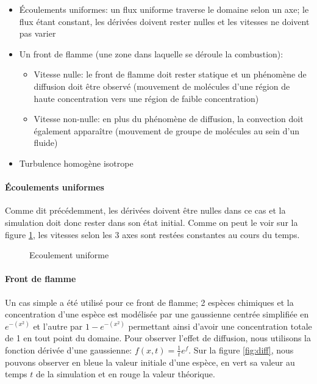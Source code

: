 \begin{itemize}
\item Écoulements uniformes: un flux uniforme traverse le domaine selon un axe; le flux étant constant, les dérivées doivent rester nulles et les vitesses ne doivent pas varier
\item Un front de flamme (une zone dans laquelle se déroule la combustion):
  \begin{itemize}
  \item Vitesse nulle: le front de flamme doit rester statique et un phénomène de diffusion doit être observé (mouvement de molécules d'une région de haute concentration vers une région de faible concentration)
  \item Vitesse non-nulle: en plus du phénomène de diffusion, la convection doit également apparaître (mouvement de groupe de molécules au sein d'un fluide)
  \end{itemize}
\item Turbulence homogène isotrope
\end{itemize}

\paragraph{Écoulements uniformes}
Comme dit précédemment, les dérivées doivent être nulles dans ce cas et la simulation doit donc rester dans son état initial. Comme on peut le voir sur la figure \ref{fig:uniform_flow}, les vitesses selon les 3 axes sont restées constantes au cours du temps.
 
\begin{figure}[ht]
  \centering
  \caption{\label{fig:uniform_flow}Ecoulement uniforme}
\end{figure}

\paragraph{Front de flamme}
Un cas simple a été utilisé pour ce front de flamme; 2 espèces chimiques et la concentration d'une espèce est modélisée par une gaussienne centrée simplifiée en $e^{-(x^2)}$ et l'autre par $1-e^{-(x^2)}$ permettant ainsi d'avoir une concentration totale de 1 en tout point du domaine. Pour observer l'effet de diffusion, nous utilisons la fonction dérivée d'une gaussienne: $f(x,t)=\frac{1}{t}e^{f}$. Sur la figure \ref{fig:diff}, nous pouvons observer en bleue la valeur initiale d'une espèce, en vert sa valeur au temps $t$ de la simulation et en rouge la valeur théorique.

